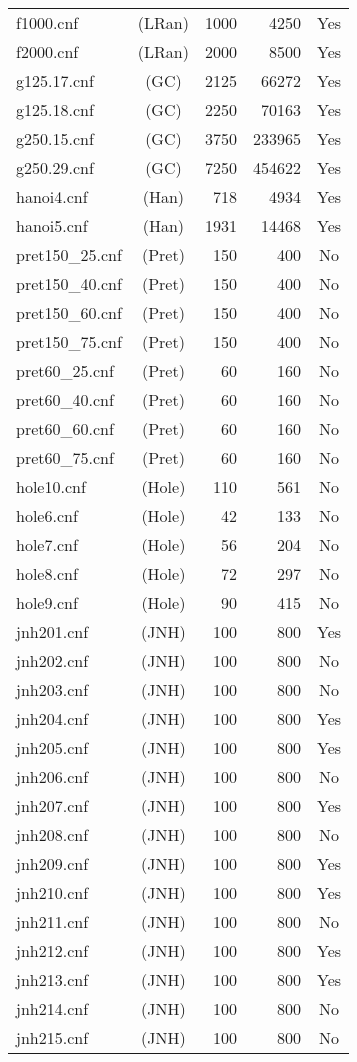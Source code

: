 \begin{supertabular}{|lc|rr|c|}
f1000.cnf&(LRan)&1000 &4250 &Yes\\
f2000.cnf&(LRan)&2000 &8500 &Yes\\
g125.17.cnf&(GC)&2125 &66272 & Yes\\
g125.18.cnf&(GC)&2250 &70163 & Yes\\
g250.15.cnf&(GC)&3750&233965&Yes\\
g250.29.cnf&(GC)&7250&454622&Yes\\
hanoi4.cnf&(Han)&718 &4934 &Yes\\
hanoi5.cnf&(Han)&1931 &14468 &Yes\\
pret150\_25.cnf&(Pret)&150&400 & No\\
pret150\_40.cnf&(Pret)&150&400 & No\\
pret150\_60.cnf&(Pret)&150&400 & No\\
pret150\_75.cnf&(Pret)&150&400 & No\\
pret60\_25.cnf&(Pret)&60&160 & No\\
pret60\_40.cnf&(Pret)&60&160 & No\\
pret60\_60.cnf&(Pret)&60&160 & No\\
pret60\_75.cnf&(Pret)&60&160 & No\\
hole10.cnf&(Hole)&110&561&No\\
hole6.cnf&(Hole)&42&133&No\\
hole7.cnf&(Hole)&56&204&No\\
hole8.cnf&(Hole)&72&297&No\\
hole9.cnf&(Hole)&90&415&No\\
jnh201.cnf&(JNH)&100&800&Yes\\
jnh202.cnf&(JNH)&100&800&No\\
jnh203.cnf&(JNH)&100&800&No\\
jnh204.cnf&(JNH)&100&800&Yes\\
jnh205.cnf&(JNH)&100&800&Yes\\
jnh206.cnf&(JNH)&100&800&No\\
jnh207.cnf&(JNH)&100&800&Yes\\
jnh208.cnf&(JNH)&100&800&No\\
jnh209.cnf&(JNH)&100&800&Yes\\
jnh210.cnf&(JNH)&100&800&Yes\\
jnh211.cnf&(JNH)&100&800&No\\
jnh212.cnf&(JNH)&100&800&Yes\\
jnh213.cnf&(JNH)&100&800&Yes\\
jnh214.cnf&(JNH)&100&800&No\\
jnh215.cnf&(JNH)&100&800&No\\

\end{supertabular}
